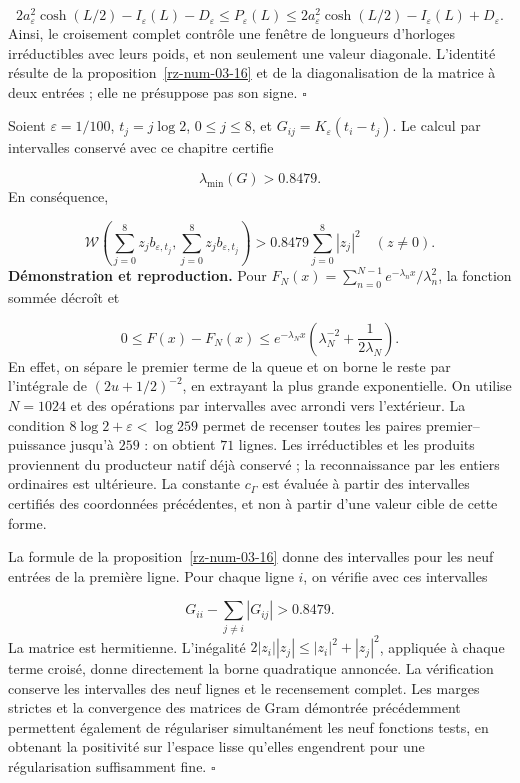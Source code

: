 \[
2a_\varepsilon^2\cosh(L/2)-I_\varepsilon(L)-D_\varepsilon
\leq P_\varepsilon(L)
\leq
2a_\varepsilon^2\cosh(L/2)-I_\varepsilon(L)+D_\varepsilon.
\]
Ainsi, le croisement complet contrôle une fenêtre de longueurs d’horloges irréductibles avec leurs poids, et non seulement une valeur diagonale. L’identité résulte de la proposition~\ref{rz-num-03-16} et de la diagonalisation de la matrice à deux entrées ; elle ne présuppose pas son signe. \hfill\(\square\)

Soient \(\varepsilon=1/100\), \(t_j=j\log2\), \(0\leq j\leq8\), et \(G_{ij}=K_\varepsilon(t_i-t_j)\). Le calcul par intervalles conservé avec ce chapitre certifie

\[
\lambda_{\min}(G)>0.8479.
\]
En conséquence,

\[
\mathscr W\left(\sum_{j=0}^8z_jb_{\varepsilon,t_j},
\sum_{j=0}^8z_jb_{\varepsilon,t_j}\right)
>0.8479\sum_{j=0}^8|z_j|^2
\quad(z\neq0).
\]
\textbf{Démonstration et reproduction.} Pour \(F_N(x)=\sum_{n=0}^{N-1}e^{-\lambda_nx}/\lambda_n^2\), la fonction sommée décroît et

\[
0\leq F(x)-F_N(x)
\leq e^{-\lambda_Nx}
\left(\lambda_N^{-2}+\frac1{2\lambda_N}\right).
\]
En effet, on sépare le premier terme de la queue et on borne le reste par l’intégrale de \((2u+1/2)^{-2}\), en extrayant la plus grande exponentielle. On utilise \(N=1024\) et des opérations par intervalles avec arrondi vers l’extérieur. La condition \(8\log2+\varepsilon<\log259\) permet de recenser toutes les paires premier–puissance jusqu’à \(259\) : on obtient \(71\) lignes. Les irréductibles et les produits proviennent du producteur natif déjà conservé ; la reconnaissance par les entiers ordinaires est ultérieure. La constante \(c_\Gamma\) est évaluée à partir des intervalles certifiés des coordonnées précédentes, et non à partir d’une valeur cible de cette forme.

La formule de la proposition~\ref{rz-num-03-16} donne des intervalles pour les neuf entrées de la première ligne. Pour chaque ligne \(i\), on vérifie avec ces intervalles

\[
G_{ii}-\sum_{j\neq i}|G_{ij}|>0.8479.
\]
La matrice est hermitienne. L'inégalité \(2|z_i||z_j|\leq|z_i|^2+|z_j|^2\), appliquée à chaque terme croisé, donne directement la borne quadratique annoncée. La vérification conserve les intervalles des neuf lignes et le recensement complet. Les marges strictes et la convergence des matrices de Gram démontrée précédemment permettent également de régulariser simultanément les neuf fonctions tests, en obtenant la positivité sur l'espace lisse qu'elles engendrent pour une régularisation suffisamment fine. \hfill\(\square\)

